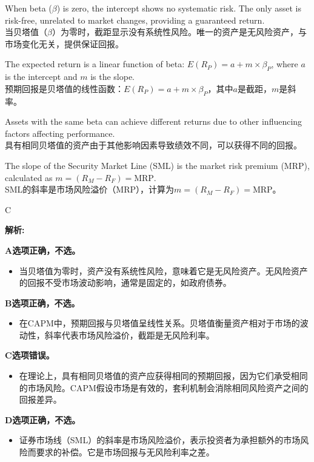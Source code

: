 \documentclass{article}
\newenvironment{explanation}
{\textbf{解析:}\par}
{\par}
\begin{document}
\begin{choices}
    \item When beta (\(\beta\)) is zero, the intercept shows no systematic risk. The only asset is risk-free, unrelated to market changes, providing a guaranteed return.
    \\
    当贝塔值（\(\beta\)）为零时，截距显示没有系统性风险。唯一的资产是无风险资产，与市场变化无关，提供保证回报。
    \item The expected return is a linear function of beta: \(E(R_P) = a + m \times \beta_P\), where \(a\) is the intercept and \(m\) is the slope.
    \\
    预期回报是贝塔值的线性函数：\(E(R_P) = a + m \times \beta_P\)，其中\(a\)是截距，\(m\)是斜率。
    \item Assets with the same beta can achieve different returns due to other influencing factors affecting performance.
    \\
    具有相同贝塔值的资产由于其他影响因素导致绩效不同，可以获得不同的回报。
    \item The slope of the Security Market Line (SML) is the market risk premium (MRP), calculated as \(m = (R_M - R_F) = \text{MRP}\).
    \\
    SML的斜率是市场风险溢价（MRP），计算为\(m = (R_M - R_F) = \text{MRP}\)。
\end{choices}

\begin{correctanswer}
    C
\end{correctanswer}

\begin{explanation}
    \textbf{A选项正确，不选。}
    \begin{itemize}
        \item 当贝塔值为零时，资产没有系统性风险，意味着它是无风险资产。无风险资产的回报不受市场波动影响，通常是固定的，如政府债券。
    \end{itemize}
    
    \textbf{B选项正确，不选。}
    \begin{itemize}
        \item 在CAPM中，预期回报与贝塔值呈线性关系。贝塔值衡量资产相对于市场的波动性，斜率代表市场风险溢价，截距是无风险利率。
    \end{itemize}
    
    \textbf{C选项错误。}
    \begin{itemize}
        \item 在理论上，具有相同贝塔值的资产应获得相同的预期回报，因为它们承受相同的市场风险。CAPM假设市场是有效的，套利机制会消除相同风险资产之间的回报差异。
    \end{itemize}
    
    \textbf{D选项正确，不选。}
    \begin{itemize}
        \item 证券市场线（SML）的斜率是市场风险溢价，表示投资者为承担额外的市场风险而要求的补偿。它是市场回报与无风险利率之差。
    \end{itemize}
\end{explanation}
    
\end{document}
